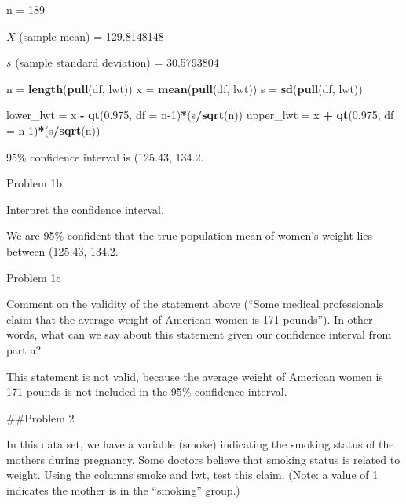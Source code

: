 \documentclass[
]{article}
\newenvironment{Shaded}{\begin{snugshade}}{\end{snugshade}}
\newcommand{\AttributeTok}[1]{\textcolor[rgb]{0.13,0.29,0.53}{#1}}
\newcommand{\DecValTok}[1]{\textcolor[rgb]{0.00,0.00,0.81}{#1}}
\newcommand{\FloatTok}[1]{\textcolor[rgb]{0.00,0.00,0.81}{#1}}
\newcommand{\FunctionTok}[1]{\textcolor[rgb]{0.13,0.29,0.53}{\textbf{#1}}}
\newcommand{\NormalTok}[1]{#1}
\newcommand{\OtherTok}[1]{\textcolor[rgb]{0.56,0.35,0.01}{#1}}
\newcommand{\SpecialCharTok}[1]{\textcolor[rgb]{0.81,0.36,0.00}{\textbf{#1}}}
\begin{document}
n = 189

\(\bar{X}\) (sample mean) = 129.8148148

\(s\) (sample standard deviation) = 30.5793804

\begin{Shaded}
\begin{Highlighting}[]
\NormalTok{n }\OtherTok{=} \FunctionTok{length}\NormalTok{(}\FunctionTok{pull}\NormalTok{(df, lwt))}
\NormalTok{x }\OtherTok{=} \FunctionTok{mean}\NormalTok{(}\FunctionTok{pull}\NormalTok{(df, lwt))}
\NormalTok{s }\OtherTok{=} \FunctionTok{sd}\NormalTok{(}\FunctionTok{pull}\NormalTok{(df, lwt))}
\end{Highlighting}
\end{Shaded}

\begin{Shaded}
\begin{Highlighting}[]
\NormalTok{lower\_lwt }\OtherTok{=}\NormalTok{ x }\SpecialCharTok{{-}} \FunctionTok{qt}\NormalTok{(}\FloatTok{0.975}\NormalTok{, }\AttributeTok{df =}\NormalTok{ n}\DecValTok{{-}1}\NormalTok{)}\SpecialCharTok{*}\NormalTok{(s}\SpecialCharTok{/}\FunctionTok{sqrt}\NormalTok{(n))}
\NormalTok{upper\_lwt }\OtherTok{=}\NormalTok{ x }\SpecialCharTok{+} \FunctionTok{qt}\NormalTok{(}\FloatTok{0.975}\NormalTok{, }\AttributeTok{df =}\NormalTok{ n}\DecValTok{{-}1}\NormalTok{)}\SpecialCharTok{*}\NormalTok{(s}\SpecialCharTok{/}\FunctionTok{sqrt}\NormalTok{(n))}
\end{Highlighting}
\end{Shaded}

95\% confidence interval is (125.43, 134.2.

Problem 1b

Interpret the confidence interval.

We are 95\% confident that the true population mean of women's weight
lies between (125.43, 134.2.

Problem 1c

Comment on the validity of the statement above (``Some medical
professionals claim that the average weight of American women is 171
pounds''). In other words, what can we say about this statement given
our confidence interval from part a?

This statement is not valid, because the average weight of American
women is 171 pounds is not included in the 95\% confidence interval.

\#\#Problem 2

In this data set, we have a variable (smoke) indicating the smoking
status of the mothers during pregnancy. Some doctors believe that
smoking status is related to weight. Using the columns smoke and lwt,
test this claim. (Note: a value of 1 indicates the mother is in the
``smoking'' group.)
\end{document}
